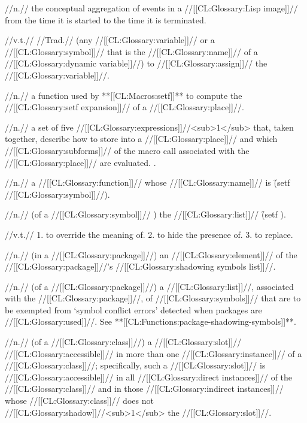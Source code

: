  //n.// the conceptual aggregation of events in a //[[CL:Glossary:Lisp image]]// from the time it is started to the time it is terminated.

 //v.t.// //Trad.// (any //[[CL:Glossary:variable]]// or a //[[CL:Glossary:symbol]]// that is the //[[CL:Glossary:name]]// of a //[[CL:Glossary:dynamic variable]]//) to //[[CL:Glossary:assign]]// the //[[CL:Glossary:variable]]//.

 //n.// a function used by **[[CL:Macros:setf]]** to compute the //[[CL:Glossary:setf expansion]]// of a //[[CL:Glossary:place]]//.

 //n.// a set of five //[[CL:Glossary:expressions]]//<sub>1</sub> that, taken together, describe how to store into a //[[CL:Glossary:place]]// and which //[[CL:Glossary:subforms]]// of the macro call associated with the //[[CL:Glossary:place]]// are evaluated. \Seesection\SetfExpansions.
 
 //n.// a //[[CL:Glossary:function]]// whose //[[CL:Glossary:name]]// is \f{(setf //[[CL:Glossary:symbol]]//)}.

 //n.// (of a //[[CL:Glossary:symbol]]// ) the //[[CL:Glossary:list]]// \f{(setf )}.

 //v.t.// 1. to override the meaning of.  2. to hide the presence of.  3. to replace. 

 //n.// (in a //[[CL:Glossary:package]]//) an //[[CL:Glossary:element]]// of the //[[CL:Glossary:package]]//'s //[[CL:Glossary:shadowing symbols list]]//.

 //n.// (of a //[[CL:Glossary:package]]//) a //[[CL:Glossary:list]]//, associated with the //[[CL:Glossary:package]]//, of //[[CL:Glossary:symbols]]// that are to be exempted from `symbol conflict errors' detected when packages are //[[CL:Glossary:used]]//. See **[[CL:Functions:package-shadowing-symbols]]**.

 //n.// (of a //[[CL:Glossary:class]]//) a //[[CL:Glossary:slot]]// //[[CL:Glossary:accessible]]// in more than one //[[CL:Glossary:instance]]// of a //[[CL:Glossary:class]]//; specifically, such a //[[CL:Glossary:slot]]// is //[[CL:Glossary:accessible]]// in all //[[CL:Glossary:direct instances]]// of the //[[CL:Glossary:class]]// and in those //[[CL:Glossary:indirect instances]]// whose //[[CL:Glossary:class]]// does not //[[CL:Glossary:shadow]]//<sub>1</sub> the //[[CL:Glossary:slot]]//.
 
